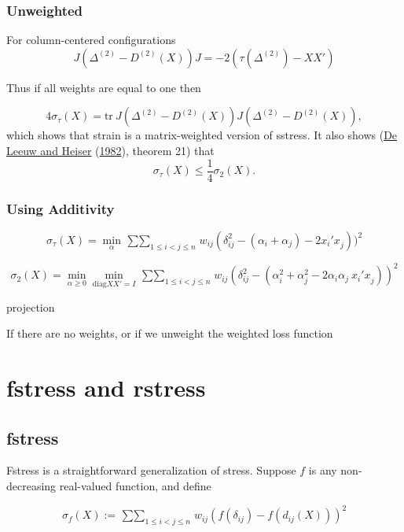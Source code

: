 \documentclass[
  12pt,
]{book}
\theoremstyle{definition}
\theoremstyle{definition}
\theoremstyle{definition}
\theoremstyle{definition}
\theoremstyle{remark}
\begin{document}
\hypertarget{unweighted}{%
\subsection{Unweighted}\label{unweighted}}

For column-centered configurations
\[
J(\Delta^{(2)}-D^{(2)}(X))J=-2(\tau(\Delta^{(2)})-XX')
\]

Thus if all weights are equal to one then

\[
4\sigma_\tau(X)=\text{tr}\ J(\Delta^{(2)}-D^{(2)}(X))J(\Delta^{(2)}-D^{(2)}(X)),
\]
which shows that strain is a matrix-weighted version of sstress. It also shows (\protect\hyperlink{ref-deleeuw_heiser_C_82}{De Leeuw and Heiser} (\protect\hyperlink{ref-deleeuw_heiser_C_82}{1982}), theorem 21) that
\[
\sigma_\tau(X)\leq\frac14\sigma_2(X).
\]

\hypertarget{using-additivity}{%
\subsection{Using Additivity}\label{using-additivity}}

\[
\sigma_\tau(X)=\min_{\alpha}\mathop{\sum\sum}_{1\leq i<j\leq n}w_{ij}(\delta_{ij}^2-(\alpha_i+\alpha_j)-2x_i'x_j^{\ }))^2
\]

\[
\sigma_2(X)=\min_{\alpha\geq 0}\min_{\text{diag}XX'=I}\mathop{\sum\sum}_{1\leq i<j\leq n}w_{ij}(\delta_{ij}^2-(\alpha_i^2+\alpha_j^2-2\alpha_i\alpha_j\ x_i'x_j^{\ }))^2
\]

projection

If there are no weights, or if we unweight the weighted loss function

\hypertarget{chrstress}{%
\chapter{fstress and rstress}\label{chrstress}}

\hypertarget{fstress}{%
\section{fstress}\label{fstress}}

Fstress is a straightforward generalization of stress. Suppose \(f\) is any non-decreasing real-valued function, and define

\begin{equation}
\sigma_f(X):=\mathop{\sum\sum}_{1\leq i<j\leq n}w_{ij}(f(\delta_{ij})-f(d_{ij}(X)))^2
\label{eq:fstress}
\end{equation}
\end{document}
